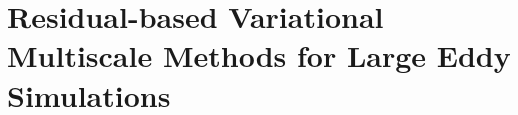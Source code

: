 \chapter{Residual-based Variational Multiscale Methods for Large Eddy Simulations}
\label{chap-Rb_VMS}


%
%
%
